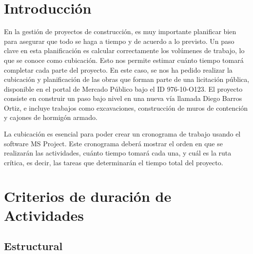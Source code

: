 \documentclass{article} %
\begin{document}
\newpage
\tableofcontents
\thispagestyle{plain} %
\thispagestyle{empty} %
\newpage

\setcounter{page}{1} %
\section{Introducción}

En la gestión de proyectos de construcción, es muy importante planificar bien para asegurar que todo se haga a tiempo y de acuerdo a lo previsto. Un paso clave en esta planificación es calcular correctamente los volúmenes de trabajo, lo que se conoce como cubicación. Esto nos permite estimar cuánto tiempo tomará completar cada parte del proyecto. En este caso, se nos ha pedido realizar la cubicación y planificación de las obras que forman parte de una licitación pública, disponible en el portal de Mercado Público bajo el ID 976-10-O123. El proyecto consiste en construir un paso bajo nivel en una nueva vía llamada Diego Barros Ortiz, e incluye trabajos como excavaciones, construcción de muros de contención y cajones de hormigón armado.

La cubicación es esencial para poder crear un cronograma de trabajo usando el software MS Project. Este cronograma deberá mostrar el orden en que se realizarán las actividades, cuánto tiempo tomará cada una, y cuál es la ruta crítica, es decir, las tareas que determinarán el tiempo total del proyecto.
\newpage

\section{Criterios de duración de Actividades}

\subsection{Estructural}
\end{document}
